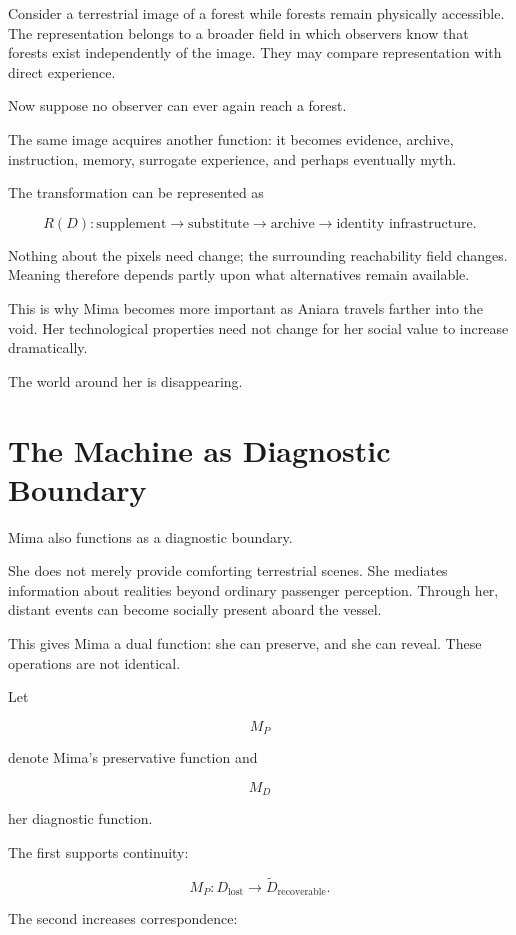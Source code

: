 \documentclass[11pt,oneside]{book}
\theoremstyle{definition}
\theoremstyle{remark}
\begin{document}
Consider a terrestrial image of a forest while forests remain physically accessible. The representation belongs to a broader field in which observers know that forests exist independently of the image. They may compare representation with direct experience.

Now suppose no observer can ever again reach a forest.

The same image acquires another function: it becomes evidence, archive, instruction, memory, surrogate experience, and perhaps eventually myth.

The transformation can be represented as

\[
R(D)
:
\text{supplement}
\rightarrow
\text{substitute}
\rightarrow
\text{archive}
\rightarrow
\text{identity infrastructure}.
\]

Nothing about the pixels need change; the surrounding reachability field changes. Meaning therefore depends partly upon what alternatives remain available.

This is why Mima becomes more important as Aniara travels farther into the void. Her technological properties need not change for her social value to increase dramatically.

The world around her is disappearing.

\section{The Machine as Diagnostic Boundary}

Mima also functions as a diagnostic boundary.

She does not merely provide comforting terrestrial scenes. She mediates information about realities beyond ordinary passenger perception. Through her, distant events can become socially present aboard the vessel.

This gives Mima a dual function: she can preserve, and she can reveal. These operations are not identical.

Let

\[
M_P
\]

denote Mima's preservative function and

\[
M_D
\]

her diagnostic function.

The first supports continuity:

\[
M_P:
D_{\mathrm{lost}}
\rightarrow
\widetilde D_{\mathrm{recoverable}}.
\]

The second increases correspondence:
\end{document}
